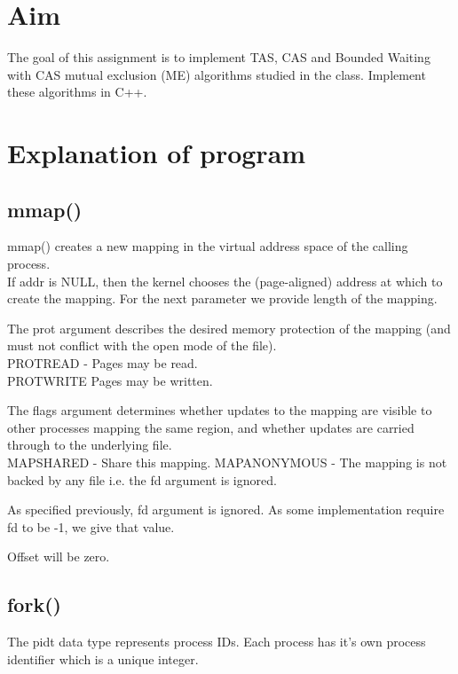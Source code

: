 \documentclass[12pt]{article}
\begin{document}
\maketitle

\section{Aim}
The goal of this assignment is to implement TAS, CAS and Bounded Waiting with CAS
mutual exclusion (ME) algorithms studied in the class. Implement these algorithms in C++.

\section{Explanation of program}

\subsection{mmap()}
mmap() creates a new mapping in the virtual address space of the calling process. \\

If addr is NULL, then the kernel chooses the (page-aligned) address at which to create the mapping. For the next parameter we provide length of the mapping.

The prot argument describes the desired memory protection of the mapping (and must not conflict with the open mode of the file).\\
PROT\textunderscore READ -  Pages may be read.\\
PROT\textunderscore WRITE Pages may be written.

The flags argument determines whether updates to the mapping are visible to other processes mapping the same region, and whether updates are carried through to the underlying file.\\
MAP\textunderscore SHARED - Share this mapping.
MAP\textunderscore ANONYMOUS - The mapping is not backed by any file i.e. the fd argument is ignored.

As specified previously, fd argument is ignored. As some implementation require fd to be -1, we give that value.

Offset will be zero.

\subsection{fork()}

The pid\textunderscore t  data type represents process IDs. Each process has it's own process identifier which is a unique integer. \\
\end{document}
